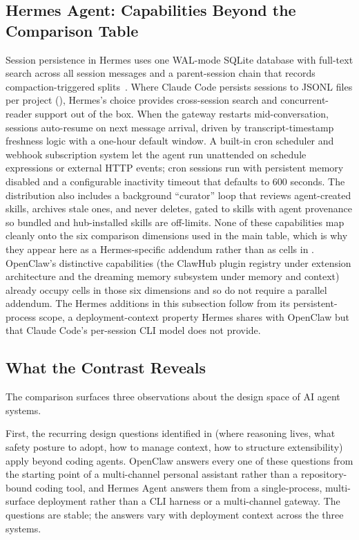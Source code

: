 \subsection{Hermes Agent: Capabilities Beyond the Comparison Table}
\label{sec:compare:hermes}

Session persistence in Hermes uses one WAL-mode SQLite database with full-text search across all session messages and a parent-session chain that records compaction-triggered splits~\tierB{}. Where Claude Code persists sessions to JSONL files per project (), Hermes's choice provides cross-session search and concurrent-reader support out of the box. When the gateway restarts mid-conversation, sessions auto-resume on next message arrival, driven by transcript-timestamp freshness logic with a one-hour default window. A built-in cron scheduler and webhook subscription system let the agent run unattended on schedule expressions or external HTTP events; cron sessions run with persistent memory disabled and a configurable inactivity timeout that defaults to 600 seconds. The distribution also includes a background ``curator'' loop that reviews agent-created skills, archives stale ones, and never deletes, gated to skills with agent provenance so bundled and hub-installed skills are off-limits. None of these capabilities map cleanly onto the six comparison dimensions used in the main table, which is why they appear here as a Hermes-specific addendum rather than as cells in . OpenClaw's distinctive capabilities (the ClawHub plugin registry under extension architecture and the dreaming memory subsystem under memory and context) already occupy cells in those six dimensions and so do not require a parallel addendum. The Hermes additions in this subsection follow from its persistent-process scope, a deployment-context property Hermes shares with OpenClaw but that Claude Code's per-session CLI model does not provide.

\subsection{What the Contrast Reveals}
\label{sec:compare:reveals}

The comparison surfaces three observations about the design space of AI agent systems.

First, the recurring design questions identified in  (where reasoning lives, what safety posture to adopt, how to manage context, how to structure extensibility) apply beyond coding agents. OpenClaw answers every one of these questions from the starting point of a multi-channel personal assistant rather than a repository-bound coding tool, and Hermes Agent answers them from a single-process, multi-surface deployment rather than a CLI harness or a multi-channel gateway. The questions are stable; the answers vary with deployment context across the three systems.

